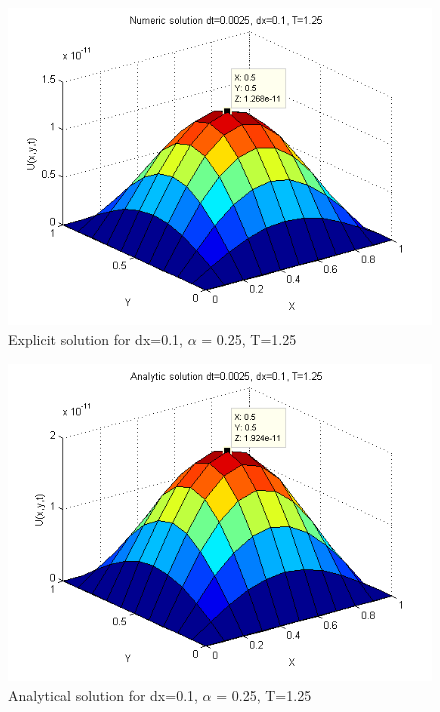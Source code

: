 \documentclass[a4paper,10pt]{article}
\begin{document}
\begin{figure}
  \begin{center}
    \includegraphics[scale=0.5]{num_dt00025_dx01_T125}
    \caption{Explicit solution for dx=0.1, $\alpha$ = 0.25, T=1.25}
    \label{fig:Num_dx0.1_dt0.0025T2}
  \end{center}
\end{figure}

\begin{figure}
  \begin{center}
    \includegraphics[scale=0.5]{ana_dt00025_dx01_T125}
    \caption{Analytical solution for dx=0.1, $\alpha$ = 0.25, T=1.25}
    \label{fig:Ana_dx0.1_dt0.0025T2}
  \end{center}
\end{figure}
\end{document}

